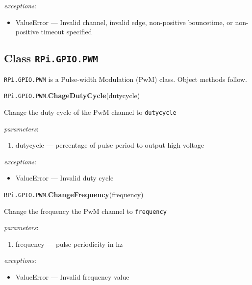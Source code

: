 \documentclass[12pt]{article}
\begin{document}
 
\textit{exceptions}:
\begin{itemize}
    \item ValueError --- Invalid channel, invalid edge, non-positive bouncetime, or  non-positive timeout specified
\end{itemize}

\subsection{Class \texttt{RPi.GPIO.PWM}} \label{pwm}
    
\texttt{RPi.GPIO.PWM} is a Pulse-width Modulation (PwM) class. Object methods follow.

\medskip \medskip

\noindent \texttt{RPi.GPIO.PWM}.\textbf{ChageDutyCycle}(dutycycle)
        
Change the duty cycle of the PwM channel to \texttt{dutycycle}
        
\textit{parameters}:
\begin{enumerate}      
        \item dutycycle --- percentage of pulse period to output high voltage
\end{enumerate}
 
 
\textit{exceptions}:
\begin{itemize}
    \item ValueError --- Invalid duty cycle
\end{itemize}

\noindent \texttt{RPi.GPIO.PWM}.\textbf{ChangeFrequency}(frequency)
        
Change the frequency the PwM channel to \texttt{frequency}
        
\textit{parameters}:
\begin{enumerate}      
        \item frequency --- pulse periodicity in hz
\end{enumerate}
 
 
\textit{exceptions}:
\begin{itemize}
    \item ValueError --- Invalid frequency value
\end{itemize}
\end{document}

